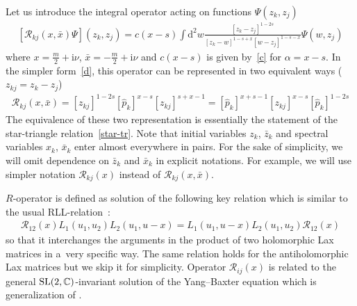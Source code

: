 \documentclass[pdftex]{sigma}
\renewcommand{\imath}{\mathrm{i}}
\numberwithin{equation}{section}
\begin{document}
Let us introduce the integral operator acting on functions $\Psi(z_k, z_j)$
\begin{align} \label{R}
 [\mathcal{R}_{k j}(x,\bar{x}) \Psi ](z_k, z_j) =
	c(x-s)
	\int \mathrm{d}^2 w
	\frac{[z_k-z_j]^{1-2s}}{[z_k-w]^{1-s+x} [w-z_j]^{1-s-x}}
	\Psi(w,z_j)
\end{align}
where $x = \frac{m}{2}+\imath\nu$, $\bar{x} = -\frac{m}{2}+\imath\nu$ and
$c(x-s)$ is given by~\eqref{c} for $\alpha=x-s$.
In the simpler form~\eqref{d}, this operator
can be represented in two equivalent ways ($z_{kj} = z_k-z_j$)
\begin{align}\label{R1}
\mathcal{R}_{k j}(x,\bar{x}) =
[z_{kj}]^{1-2s} [\hat{p}_k]^{x-s} [z_{kj}]^{s+x-1} =
[\hat{p}_k]^{x+s-1} [z_{kj}]^{x-s}
 [\hat{p}_k]^{1-2s}
\end{align}
The equivalence of these two representation
is essentially the statement of the star-triangle
relation~\eqref{star-tr}.
Note that initial variables $z_k$, $\bar{z}_k$ and spectral variables
$x_k$, $\bar{x}_k$ enter almost everywhere in pairs.
For the sake of simplicity, we will omit dependence on $\bar{z}_k$
and $\bar{x}_k$ in explicit notations. For example, we will
use simpler notation $\mathcal{R}_{k j}(x)$ instead of
$\mathcal{R}_{k j}(x,\bar{x})$.

$R$-operator is defined as solution of the following key relation which is similar to the usual RLL-relation~\cite{KRS}:
\begin{align}\label{defR}
\mathcal{R}_{1 2}(x) L_1(u_1, u_2) L_2(u_1, u-x) =
L_1(u_1, u-x) L_2(u_1, u_2) \mathcal{R}_{1 2}(x)
\end{align}
so that it interchanges the arguments in the product of
two holomorphic Lax matrices in a~very specific way.
The same relation holds for the antiholomorphic Lax matrices
but we skip it for simplicity.
Operator $\mathcal{R}_{i j}(x)$ is related to the general ${\rm SL}(2,\mathbb{C})$-invariant solution of the Yang--Baxter equation \cite{D1,DM1} which is generalization of \cite{KRS}.
\end{document}
